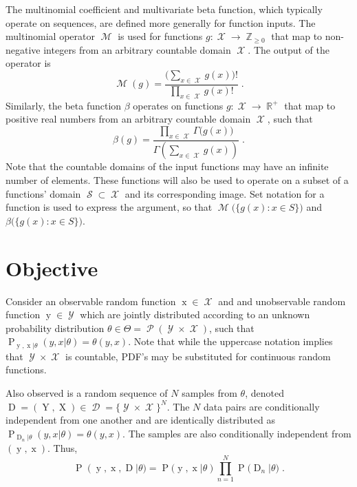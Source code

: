 \documentclass[12pt]{report}
\DeclareMathOperator{\xrm}{\mathrm{x}}
\DeclareMathOperator{\Xrm}{\mathrm{X}}
\DeclareMathOperator{\yrm}{\mathrm{y}}
\DeclareMathOperator{\Yrm}{\mathrm{Y}}
\DeclareMathOperator{\Drm}{\mathrm{D}}
\DeclareMathOperator{\Prm}{\mathrm{P}}
\DeclareMathOperator{\Xcal}{\mathcal{X}}
\DeclareMathOperator{\Ycal}{\mathcal{Y}}
\DeclareMathOperator{\Dcal}{\mathcal{D}}
\DeclareMathOperator{\Mcal}{\mathcal{M}}
\DeclareMathOperator{\Scal}{\mathcal{S}}
\DeclareMathOperator{\Pcal}{\mathcal{P}}
\DeclareMathOperator{\Rbb}{\mathbb{R}}
\DeclareMathOperator{\Zbb}{\mathbb{Z}}
\begin{document}
The multinomial coefficient and multivariate beta function, which typically operate on sequences, are defined more generally for function inputs. The multinomial operator $\Mcal$ is used for functions $g : \Xcal \to \Zbb_{\geq 0}$ that map to non-negative integers from an arbitrary countable domain $\Xcal$. The output of the operator is
\begin{equation}
\Mcal(g) = \frac{\big( \sum_{x \in \Xcal} g(x) \big)!}{\prod_{x \in \Xcal} g(x)!} \;.
\end{equation}
Similarly, the beta function $\beta$ operates on functions $g : \Xcal \to \Rbb^+$ that map to positive real numbers from an arbitrary countable domain $\Xcal$, such that
\begin{equation}
\beta(g) = \frac{\prod_{x \in \Xcal} \Gamma\big( g(x) \big)}{\Gamma \left( \sum_{x \in \Xcal} g(x) \right)} \;.
\end{equation}
Note that the countable domains of the input functions may have an infinite number of elements. These functions will also be used to operate on a subset of a functions' domain $\Scal \subset \Xcal$ and its corresponding image. Set notation for a function is used to express the argument, so that $\Mcal\Big( \big\{ g(x) : x \in S \big\} \Big)$ and $\beta\Big( \big\{ g(x) : x \in S \big\} \Big)$.








\section{Objective}

Consider an observable random function $\xrm \in \Xcal$ and and unobservable random function $\yrm \in \Ycal$ which are jointly distributed according to an unknown probability distribution $\theta \in \Theta = \Pcal(\Ycal \times \Xcal)$, such that $\Prm_{\yrm,\xrm | \theta}(y,x | \theta) = \theta(y,x)$. Note that while the uppercase notation implies that $\Ycal \times \Xcal$ is countable, PDF's may be substituted for continuous random functions.

Also observed is a random sequence of $N$ samples from $\theta$, denoted $\Drm = ( \Yrm,\Xrm ) \in \Dcal = \{\Ycal \times \Xcal\}^N$. The $N$ data pairs are conditionally independent from one another and are identically distributed as $\Prm_{\Drm_n | \theta}(y,x | \theta) = \theta(y,x)$. The samples are also conditionally independent from $(\yrm,\xrm)$. Thus,
\begin{equation}
\Prm(\yrm,\xrm,\Drm | \theta) = \Prm(\yrm,\xrm | \theta) \prod_{n=1}^N \Prm\big( \Drm_n | \theta \big) \;.
\end{equation}
\end{document}
